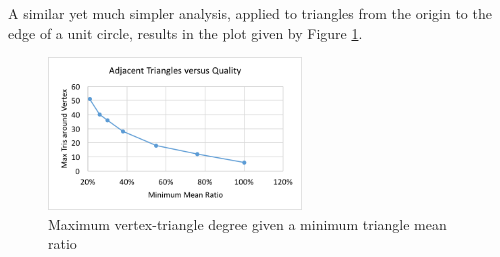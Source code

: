 A similar yet much simpler analysis, applied to triangles
from the origin to the edge of a unit circle, results in the
plot given by Figure \ref{fig:max_tri_deg}.

\begin{figure}
\begin{center}
\includegraphics[width=0.6\textwidth]{max_tri_deg.png}
\caption{Maximum vertex-triangle degree given a minimum triangle mean ratio}
\label{fig:max_tri_deg}
\end{center}
\end{figure}
